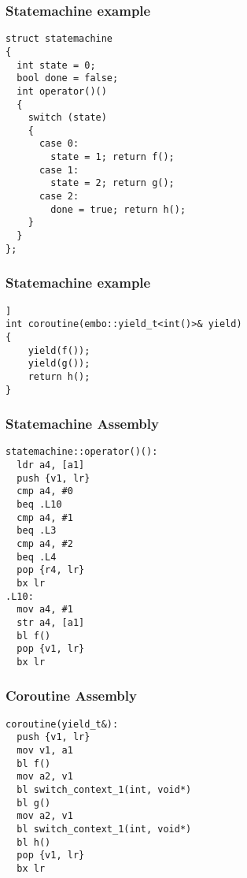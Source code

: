 \documentclass{beamer}
\begin{document}
\begin{frame}[fragile]
\frametitle{Statemachine example}
\begin{block}{}
\begin{lstlisting}[basicstyle=\small]
struct statemachine
{
  int state = 0;
  bool done = false;
  int operator()()
  {
    switch (state)
    {
      case 0:        
        state = 1; return f();
      case 1:
        state = 2; return g(); 
      case 2:
        done = true; return h();
    }
  }
};
\end{lstlisting}
\end{block}
\end{frame}

\begin{frame}[fragile]
\frametitle{Statemachine example}
\begin{block}{}
\begin{lstlisting}[basicstyle=\small]]
int coroutine(embo::yield_t<int()>& yield)
{
    yield(f());
    yield(g());
    return h();
}
\end{lstlisting}
\end{block}
\end{frame}

\begin{frame}[fragile]
\frametitle{Statemachine Assembly}

\begin{block}{}
\begin{lstlisting}[language=ASM, basicstyle=\small]
statemachine::operator()():
  ldr a4, [a1]
  push {v1, lr}
  cmp a4, #0
  beq .L10
  cmp a4, #1
  beq .L3
  cmp a4, #2
  beq .L4
  pop {r4, lr}
  bx lr
.L10:
  mov a4, #1
  str a4, [a1]
  bl f()
  pop {v1, lr}
  bx lr
\end{lstlisting}
\end{block}
\end{frame}

\begin{frame}[fragile]
\frametitle{Coroutine Assembly}
\begin{block}{}
\begin{lstlisting}[language=ASM, basicstyle=\small]
coroutine(yield_t&):
  push {v1, lr}
  mov v1, a1	
  bl f()
  mov a2, v1
  bl switch_context_1(int, void*)
  bl g()
  mov a2, v1
  bl switch_context_1(int, void*)
  bl h()
  pop {v1, lr}
  bx lr
\end{lstlisting}
\end{block}
\end{frame}
\end{document}
